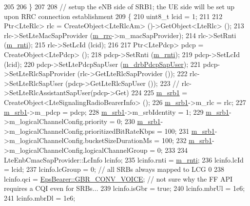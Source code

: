 \begin{DoxyCode}
205 
206   \}
207 
208   \textcolor{comment}{// setup the eNB side of SRB1; the UE side will be set up upon RRC connection establishment}
209   \{
210     uint8\_t lcid = 1;
211 
212     Ptr<LteRlc> rlc = CreateObject<LteRlcAm> ()->GetObject<LteRlc> ();
213     rlc->SetLteMacSapProvider (\hyperlink{classns3_1_1UeManager_ab4405e9f354c66e7c1a4c95832290f5b}{m\_rrc}->m\_macSapProvider);
214     rlc->SetRnti (\hyperlink{classns3_1_1UeManager_a5a72b4fe818f21993bd7f05d7e2c4f83}{m\_rnti});
215     rlc->SetLcId (lcid);
216 
217     Ptr<LtePdcp> pdcp = CreateObject<LtePdcp> ();
218     pdcp->SetRnti (\hyperlink{classns3_1_1UeManager_a5a72b4fe818f21993bd7f05d7e2c4f83}{m\_rnti});
219     pdcp->SetLcId (lcid);
220     pdcp->SetLtePdcpSapUser (\hyperlink{classns3_1_1UeManager_af261f8dc60848f41e18c9fba89d9903d}{m\_drbPdcpSapUser});
221     pdcp->SetLteRlcSapProvider (rlc->GetLteRlcSapProvider ());
222     rlc->SetLteRlcSapUser (pdcp->GetLteRlcSapUser ());
223    \textcolor{comment}{// rlc->SetLteRlcAssistantSapUser(pdcp->Get)}
224 
225     \hyperlink{classns3_1_1UeManager_a196852199b6a48c365eadfec4ba89935}{m\_srb1} = CreateObject<LteSignalingRadioBearerInfo> ();
226     \hyperlink{classns3_1_1UeManager_a196852199b6a48c365eadfec4ba89935}{m\_srb1}->m\_rlc = rlc;
227     \hyperlink{classns3_1_1UeManager_a196852199b6a48c365eadfec4ba89935}{m\_srb1}->m\_pdcp = pdcp;
228     \hyperlink{classns3_1_1UeManager_a196852199b6a48c365eadfec4ba89935}{m\_srb1}->m\_srbIdentity = 1;
229     \hyperlink{classns3_1_1UeManager_a196852199b6a48c365eadfec4ba89935}{m\_srb1}->m\_logicalChannelConfig.priority = 0;
230     \hyperlink{classns3_1_1UeManager_a196852199b6a48c365eadfec4ba89935}{m\_srb1}->m\_logicalChannelConfig.prioritizedBitRateKbps = 100;
231     \hyperlink{classns3_1_1UeManager_a196852199b6a48c365eadfec4ba89935}{m\_srb1}->m\_logicalChannelConfig.bucketSizeDurationMs = 100;
232     \hyperlink{classns3_1_1UeManager_a196852199b6a48c365eadfec4ba89935}{m\_srb1}->m\_logicalChannelConfig.logicalChannelGroup = 0;
233 
234     LteEnbCmacSapProvider::LcInfo lcinfo;
235     lcinfo.rnti = \hyperlink{classns3_1_1UeManager_a5a72b4fe818f21993bd7f05d7e2c4f83}{m\_rnti};
236     lcinfo.lcId = lcid;
237     lcinfo.lcGroup = 0; \textcolor{comment}{// all SRBs always mapped to LCG 0}
238     lcinfo.qci = \hyperlink{structns3_1_1EpsBearer_aecf0c67109c5eb4ec0b07226fff5885ea02ebd970315c3f749f5abac6e0c3e6d7}{EpsBearer::GBR\_CONV\_VOICE}; \textcolor{comment}{// not sure why the FF API requires a
       CQI even for SRBs...}
239     lcinfo.isGbr = \textcolor{keyword}{true};
240     lcinfo.mbrUl = 1e6;
241     lcinfo.mbrDl = 1e6;

\end{DoxyCode}
